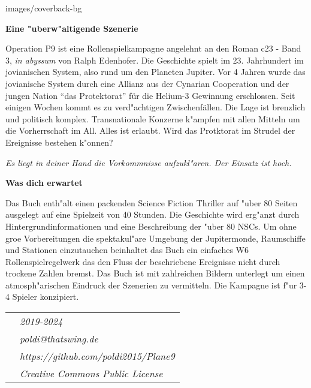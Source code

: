 \begin{backcover}{images/coverback-bg}

    \vspace{5mm}
    \textbf{Eine "uberw"altigende Szenerie}

    Operation P9 ist eine Rollenspielkampagne angelehnt an den Roman c23 - Band 3, \textit{in abyssum} von Ralph Edenhofer. Die Geschichte spielt im 23. Jahrhundert im jovianischen System, also rund um den Planeten Jupiter. Vor 4 Jahren wurde das jovianische System durch eine Allianz aus der Cynarian Cooperation und der jungen Nation "`das Protektorat"' für die Helium-3 Gewinnung erschlossen. Seit einigen Wochen kommt es zu verd"achtigen Zwischenfällen. Die Lage ist brenzlich und politisch komplex. Transnationale Konzerne k"ampfen mit allen Mitteln um die Vorherrschaft im All. Alles ist erlaubt. Wird das Protktorat im Strudel der Ereignisse bestehen k"onnen?

    \medskip
    \emph{Es liegt in deiner Hand die Vorkommnisse aufzukl"aren. Der Einsatz ist hoch.}

    \vspace{5mm}
    \textbf{Was dich erwartet}

    Das Buch enth"alt einen packenden Science Fiction Thriller auf "uber 80 Seiten ausgelegt auf eine Spielzeit von 40 Stunden. Die Geschichte wird erg"anzt durch Hintergrundinformationen und eine Beschreibung der "uber 80 NSCs. Um ohne gro\3e Vorbereitungen die spektakul"are Umgebung der Jupitermonde, Raumschiffe und Stationen einzutauchen beinhaltet das Buch ein einfaches W6 Rollenspielregelwerk das den Fluss der beschriebene Ereignisse nicht durch trockene Zahlen bremst. Das Buch ist mit zahlreichen Bildern unterlegt um einen atmosph"arischen Eindruck der Szenerien zu vermitteln. Die Kampagne ist f"ur 3-4 Spieler konzipiert.

    \vspace{15mm}
    \newcommand{\footerentry}[1]{\textit{\normalsize{}{#1}}}
    \begin{tabularx}{\textwidth} {
        >{\raggedright\arraybackslash}X
        >{\raggedleft\arraybackslash}X
    }
        & \footerentry{2019-2024} \\
        & \footerentry{poldi@thatswing.de}\\
        & \footerentry{https://github.com/poldi2015/Plane9}\\
        & \footerentry{Creative Commons Public License} 
    \end{tabularx}

\end{backcover}
